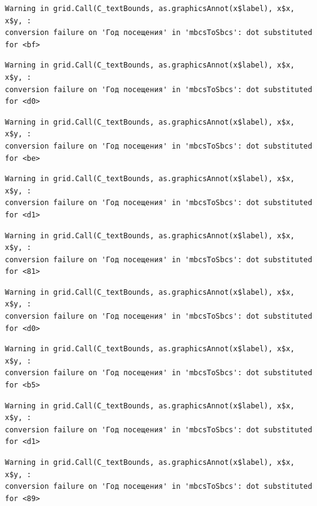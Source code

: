 \documentclass[
  letterpaper,
  DIV=11,
  numbers=noendperiod]{scrartcl}
\begin{document}
\begin{verbatim}
Warning in grid.Call(C_textBounds, as.graphicsAnnot(x$label), x$x, x$y, :
conversion failure on 'Год посещения' in 'mbcsToSbcs': dot substituted for <bf>
\end{verbatim}

\begin{verbatim}
Warning in grid.Call(C_textBounds, as.graphicsAnnot(x$label), x$x, x$y, :
conversion failure on 'Год посещения' in 'mbcsToSbcs': dot substituted for <d0>
\end{verbatim}

\begin{verbatim}
Warning in grid.Call(C_textBounds, as.graphicsAnnot(x$label), x$x, x$y, :
conversion failure on 'Год посещения' in 'mbcsToSbcs': dot substituted for <be>
\end{verbatim}

\begin{verbatim}
Warning in grid.Call(C_textBounds, as.graphicsAnnot(x$label), x$x, x$y, :
conversion failure on 'Год посещения' in 'mbcsToSbcs': dot substituted for <d1>
\end{verbatim}

\begin{verbatim}
Warning in grid.Call(C_textBounds, as.graphicsAnnot(x$label), x$x, x$y, :
conversion failure on 'Год посещения' in 'mbcsToSbcs': dot substituted for <81>
\end{verbatim}

\begin{verbatim}
Warning in grid.Call(C_textBounds, as.graphicsAnnot(x$label), x$x, x$y, :
conversion failure on 'Год посещения' in 'mbcsToSbcs': dot substituted for <d0>
\end{verbatim}

\begin{verbatim}
Warning in grid.Call(C_textBounds, as.graphicsAnnot(x$label), x$x, x$y, :
conversion failure on 'Год посещения' in 'mbcsToSbcs': dot substituted for <b5>
\end{verbatim}

\begin{verbatim}
Warning in grid.Call(C_textBounds, as.graphicsAnnot(x$label), x$x, x$y, :
conversion failure on 'Год посещения' in 'mbcsToSbcs': dot substituted for <d1>
\end{verbatim}

\begin{verbatim}
Warning in grid.Call(C_textBounds, as.graphicsAnnot(x$label), x$x, x$y, :
conversion failure on 'Год посещения' in 'mbcsToSbcs': dot substituted for <89>
\end{verbatim}
\end{document}
